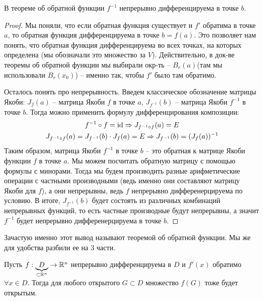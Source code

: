 \begin{follow}
    В теореме об обратной функции $f^{-1}$ непрерывно дифференцируема в точке $b$.
\end{follow}
\begin{proof}
    Мы поняли, что если обратная функция существует и $f'$ обратима в точке $a$, то обратная функция дифференцируема в точке $b = f(a)$.
    Это позволяет нам понять, что обратная функция дифференцируема во всех точках, на которых определена (мы обозначали это множество за $V$).
    Действительно, в док-ве теоремы об обратной функции мы выбирали окр-ть -- $B_r(a)$(там мы использовали $B_r(x_0)$) -- именно так, чтобы $f'$ было там обратимо.
    
    \quad Осталось понять про непрерывность. 
    Введем классическое обозначение матрицы Якоби: $J_f(a)$ -- матрица Якоби $f$ в точке $a$, $J_{f^{-1}}(b)$ -- матрица Якоби $f^{-1}$ в точке $b$.
    Тогда можно применить формулу дифференцирования композиции:
    \begin{gather*}
        f^{-1} \circ f = \operatorname{id} \Rightarrow J_{f^{-1} \circ f}(a) = E \\
        J_{f^{-1} \circ f}(a) = J_{f^{-1}}(b) \cdot J_f(a) = E \Rightarrow J_{f^{-1}}(b) = (J_f(a))^{-1} 
    \end{gather*}
    \quad Таким образом, матрица Якоби $f^{-1}$ в точке $b$ -- это обратная к матрице Якоби функции $f$ в точке $a$.
    Мы можем посчитать обратную матрицу с помощью формулы с минорами.
    Тогда мы будем производить разные арифметические операции с частными производными (ведь именно они составляют матрицу Якоби для $f$), а они непрерывны, ведь $f$ непрерывно дифференерцируема по условию.
    В итоге, $J_{f^{-1}}(b)$ будет состоять из различных комбинаций непрерывных функций, то есть частные производные будут непрерывны, а значит  $f^{-1}$ будет непрерывно дифференерцируема в точке $b$.
\end{proof}

\begin{notice}
    Зачастую именно этот вывод называют теоремой об обратной функции.
    Мы же для удобства разбили ее на 3 части.
\end{notice}

\vspace*{7mm}

\begin{follow}
    Пусть $f: \underbrace{D}_{\subset \mathbb{R}^n} \to \mathbb{R}^n$ непрерывно дифференцируема в $D$ и $f'(x)$ обратимо $\forall x \in D$.
    Тогда для любого открытого $G \subset D$ множество $f(G)$ тоже будет открытым.
\end{follow}

